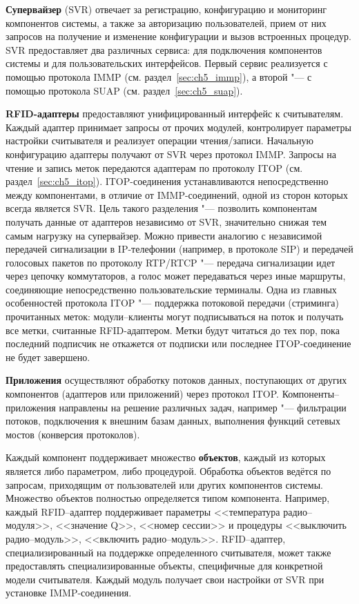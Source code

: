 \textbf{Супервайзер} (SVR) отвечает за регистрацию, конфигурацию и мониторинг компонентов системы, а также за авторизацию пользователей, прием от них запросов на получение и изменение конфигурации и вызов встроенных процедур. SVR предоставляет два различных сервиса: для подключения компонентов системы и для пользовательских интерфейсов. Первый сервис реализуется с помощью протокола IMMP (см. раздел~\ref{sec:ch5_immp}), а второй "--- с помощью протокола SUAP (см. раздел~\ref{sec:ch5_suap}).

\textbf{RFID-адаптеры} предоставляют унифицированный интерфейс к считывателям. Каждый адаптер принимает запросы от прочих модулей, контролирует параметры настройки считывателя и реализует операции чтения/записи. Начальную конфигурацию адаптеры получают от SVR через протокол IMMP. Запросы на чтение и запись меток передаются адаптерам по протоколу ITOP (см. раздел~\ref{sec:ch5_itop}). ITOP-соединения устанавливаются непосредственно между компонентами, в отличие от IMMP-соединений, одной из сторон которых всегда является SVR. Цель такого разделения "--- позволить компонентам получать данные от адаптеров независимо от SVR, значительно снижая тем самым нагрузку на супервайзер. Можно привести аналогию с независимой передачей сигнализации в IP-телефонии (например, в протоколе SIP) и передачей голосовых пакетов по протоколу RTP/RTCP "--- передача сигнализации идет через цепочку коммутаторов, а голос может передаваться через иные маршруты, соединяющие непосредственно пользовательские терминалы. Одна из главных особенностей протокола ITOP "--- поддержка потоковой передачи (стриминга) прочитанных меток: модули--клиенты могут подписываться на поток и получать все метки, считанные RFID-адаптером. Метки будут читаться до тех пор, пока последний подписчик не откажется от подписки или последнее ITOP-соединение не будет завершено.

\textbf{Приложения} осуществляют обработку потоков данных, поступающих от других компонентов (адаптеров или приложений) через протокол ITOP. Компоненты--приложения направлены на решение различных задач, например "--- фильтрации потоков, подключения к внешним базам данных, выполнения функций сетевых мостов (конверсия протоколов).

Каждый компонент поддерживает множество \textbf{объектов}, каждый из которых является либо параметром, либо процедурой. Обработка объектов ведётся по запросам, приходящим от пользователей или других компонентов системы. Множество объектов полностью определяется типом компонента. Например, каждый RFID--адаптер поддерживает параметры <<температура радио--модуля>>, <<значение Q>>, <<номер сессии>> и процедуры <<выключить радио--модуль>>, <<включить радио--модуль>>. RFID--адаптер, специализированный на поддержке определенного считывателя, может также предоставлять специализированные объекты, специфичные для конкретной модели считывателя. Каждый модуль получает свои настройки от SVR при установке IMMP-соединения.

